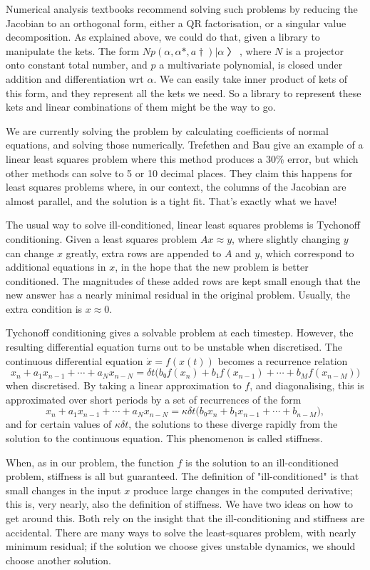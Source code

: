 Numerical analysis textbooks recommend solving such problems by reducing the Jacobian to an orthogonal form, either a QR factorisation, or a singular value decomposition.  As explained above, we could do that, given a library to manipulate the kets.  The form $N p(α,α*,a†) |α〉$, where $N$ is a projector onto constant total number, and $p$ a multivariate polynomial, is closed under addition and differentiation wrt $α$.  We can easily take inner product of kets of this form, and they represent all the kets we need.  So a library to represent these kets and linear combinations of them might be the way to go.

We are currently solving the problem by calculating coefficients of normal equations, and solving those numerically.  Trefethen and Bau give an example of a linear least squares problem where this method produces a 30\% error, but which other methods can solve to 5 or 10 decimal places.  They claim this happens for least squares problems where, in our context, the columns of the Jacobian are almost parallel, and the solution is a tight fit.  That's exactly what we have!

The usual way to solve ill-conditioned, linear least squares problems is Tychonoff conditioning.  Given a least squares problem $Ax≈y$, where slightly changing $y$ can change $x$ greatly, extra rows are appended to $A$ and $y$, which correspond to additional equations in $x$, in the hope that the new problem is better conditioned.  The magnitudes of these added rows are kept small enough that the new answer has a nearly minimal residual in the original problem.  Usually, the extra condition is $x≈0$.

Tychonoff conditioning gives a solvable problem at each timestep.  However, the resulting differential equation turns out to be unstable when discretised.  The continuous differential equation $\dot x=f(x(t))$ becomes a recurrence relation $$x_n+a_1x_{n-1}+⋯+a_Nx_{n-N} = δt\bigl(b₀f(x_n)+b₁f(x_{n-1})+⋯+b_Mf(x_{n-M})\bigr)$$ when discretised.  By taking a linear approximation to $f$, and diagonalising, this is approximated over short periods by a set of recurrences of the form $$x_n+a_1x_{n-1}+⋯+a_Nx_{n-N} = κδt\bigl(b₀x_n+b₁x_{n-1}+⋯+b_{n-M}\bigr),$$ and for certain values of $κδt$, the solutions to these diverge rapidly from the solution to the continuous equation.  This phenomenon is called stiffness.

When, as in our problem, the function $f$ is the solution to an ill-conditioned problem, stiffness is all but guaranteed.  The definition of "ill-conditioned" is that small changes in the input $x$ produce large changes in the computed derivative; this is, very nearly, also the definition of stiffness.  We have two ideas on how to get around this.  Both rely on the insight that the ill-conditioning and stiffness are accidental.  There are many ways to solve the least-squares problem, with nearly minimum residual; if the solution we choose gives unstable dynamics, we should choose another solution.

